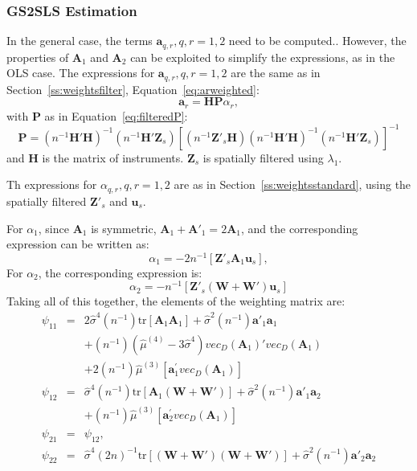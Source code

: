 \documentclass{article}
\begin{document}
\subsubsection{GS2SLS Estimation}
In the general case, the terms $\mathbf{a}_{q,r}, q, r = 1, 2$ need to be computed..
However, the properties of $\mathbf{A}_1$ and $\mathbf{A}_2$ can be exploited to
simplify the expressions, as in the OLS case.
The expressions for $\mathbf{a}_{q,r}, q, r = 1, 2$ are the same as in Section~\ref{ss:weightsfilter},
Equation~\ref{eq:arweighted}:
\begin{equation*}
\mathbf{a}_r = \mathbf{HP} \alpha_r,
\end{equation*}
with $\mathbf{P}$
as in Equation~\ref{eq:filteredP}:
\begin{equation*}
\mathbf{P} = (n^{-1}\mathbf{H'H})^{-1} ( n^{-1} \mathbf{H'Z}_s ) 
        [ (n^{-1} \mathbf{Z'}_s \mathbf{H} ) (n^{-1} \mathbf{H'H} )^{-1} (n^{-1} \mathbf{H'Z}_s) ]^{-1}
\end{equation*}
and $\mathbf{H}$ is the matrix of instruments. $\mathbf{Z}_s$ is spatially filtered using $\lambda_1$.

Th expressions for $\alpha_{q,r}, q, r = 1,2$ are as in Section~\ref{ss:weightsstandard},
using the spatially filtered $\mathbf{Z'}_s$ and $\mathbf{u}_s$. 

For $\alpha_1$, since $\mathbf{A}_1$ is symmetric, $\mathbf{A}_1 + \mathbf{A'}_1 = 2 \mathbf{A}_1$, and the corresponding expression can be written as:
\begin{equation*}
\alpha_1 = - 2 n^{-1} [ \mathbf{Z'}_s \mathbf{A}_1 \mathbf{u}_s ],
\end{equation*}
 For $\alpha_2$, the corresponding expression is:
\begin{equation*}
 \alpha_2 = - n^{-1} [ \mathbf{Z'}_s (\mathbf{W} + \mathbf{W'} ) \mathbf{u}_s ]
\end{equation*}
Taking all of this together, the elements of the weighting matrix are:
\begin{eqnarray*}
 \psi_{11} &=& 2  \hat{\sigma}^4 (n^{-1}) \mbox{tr} [ \mathbf{A}_1\mathbf{A}_1 ]
              + \hat{\sigma}^2 (n^{-1}) \mathbf{a'}_1 \mathbf{a}_1 \\
            &&+ (n^{-1}) (\hat{\mu}^{(4)} - 3 \hat{\sigma}^4) vec_D(\mathbf{A}_1)'vec_D (\mathbf{A}_1) \\
            &&+ 2 (n^{-1}) \hat{\mu}^{(3)} [ \mathbf{a}_1^{'} vec_D(\mathbf{A}_1)] \\
  \psi_{12} &=& \hat{\sigma}^4 (n^{-1}) \mbox{tr} [  \mathbf{A}_1 (\mathbf{W} + \mathbf{W'} )  ]
          + \hat{\sigma}^2 (n^{-1}) \mathbf{a'}_1 \mathbf{a}_2\\
          && +  (n^{-1}) \hat{\mu}^{(3)} [ \mathbf{a}_2^{'} vec_D(\mathbf{A}_1)]\\
      \psi_{21} &=& \psi_{12},\\
   \psi_{22} &=& \hat{\sigma}^4 (2n)^{-1} \mbox{tr} [ (\mathbf{W} + \mathbf{W'}) 
   (\mathbf{W} + \mathbf{W'}) ]
   + \hat{\sigma}^2 (n^{-1}) \mathbf{a'}_2 \mathbf{a}_2
\end{eqnarray*}
\end{document}
